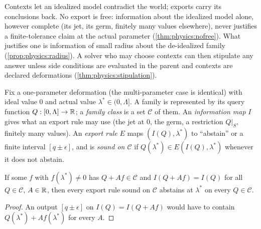 Contexts let an idealized model contradict the world; exports carry its conclusions back.
No export is free: information about the idealized model alone, however complete (its jet,
its germ, finitely many values elsewhere), never justifies a finite-tolerance claim at the
actual parameter (\cref{thm:physics:nofree}). What justifies one is information of small
radius about the de-idealized family (\cref{prop:physics:radius}). A solver who may choose
contexts can then stipulate any answer unless side conditions are evaluated in the parent
and contexts are declared deformations (\cref{thm:physics:stipulation}).

Fix a one-parameter deformation (the multi-parameter case is identical) with ideal value
$0$ and actual value $\lambda^*\in(0,\Lambda]$. A family is represented by its query
function $Q:[0,\Lambda]\to\mathbb{R}$; a \emph{family class} is a set $\mathcal C$ of them. An
\emph{information map} $I$ gives what an export rule may use (the jet at $0$, the germ, a
restriction $Q|_S$, finitely many values). An \emph{export rule} $E$ maps
$(I(Q),\lambda^*)$ to ``abstain'' or a finite interval $[q\pm\epsilon]$, and is \emph{sound
on $\mathcal C$} if $Q(\lambda^*)\in E(I(Q),\lambda^*)$ whenever it does not abstain.

\begin{lemma}\label{lem:physics:invisible}
If some $f$ with $f(\lambda^*)\neq0$ has $Q+Af\in\mathcal C$ and $I(Q+Af)=I(Q)$ for all
$Q\in\mathcal C$, $A\in\mathbb{R}$, then every export rule sound on $\mathcal C$ abstains at
$\lambda^*$ on every $Q\in\mathcal C$.
\hfill{}
\end{lemma}
\begin{proof}
An output $[q\pm\epsilon]$ on $I(Q)=I(Q+Af)$ would have to contain
$Q(\lambda^*)+Af(\lambda^*)$ for every $A$.
\end{proof}

